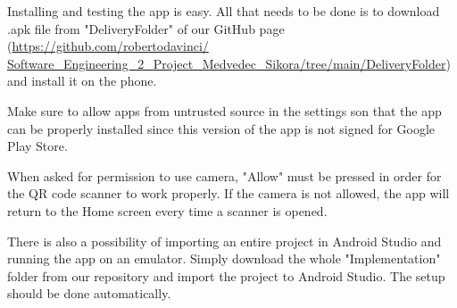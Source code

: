 \hspace{\parindent} Installing and testing the app is easy.
All that needs to be done is to download .apk file from "DeliveryFolder" of our GitHub page (\url{https://github.com/robertodavinci/ Software_Engineering_2_Project_Medvedec_Sikora/tree/main/DeliveryFolder}) and install it on the phone.\newline

Make sure to allow apps from untrusted source in the settings son that the app can be properly installed since this version of the app is not signed for Google Play Store. \newline

When asked for permission to use camera, "Allow" must be pressed in order for the QR code scanner to work properly. If the camera is not allowed, the app will return to the Home screen every time a scanner is opened.\newline

There is also a possibility of importing an entire project in Android Studio and running the app on an emulator.
Simply download the whole "Implementation" folder from our repository and import the project to Android Studio. The setup should be done automatically. 